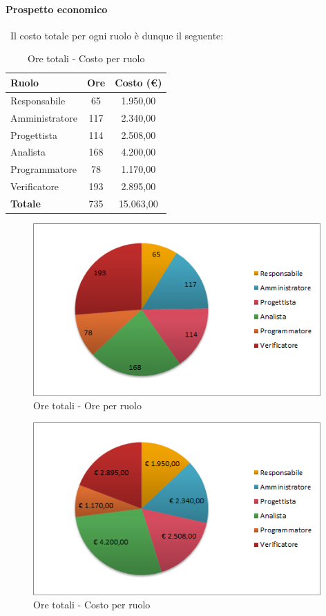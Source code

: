 \documentclass[../PianoDiProgetto.tex]{subfiles}
\begin{document}
\vfill	
	
	\paragraph{Prospetto economico}\
					Il costo totale per ogni ruolo è dunque il seguente:
	\begin{table}[H]
		\centering
		\begin{tabular}{l * {2}{c}}
			\toprule
			\textbf{Ruolo} & \textbf{Ore} & \textbf{Costo (\euro{})} \\
			\midrule
			Responsabile & 65    &  1.950,00 \\
			Amministratore  & 117   &  2.340,00 \\
			Progettista  & 114   &  2.508,00 \\
			Analista & 168   &  4.200,00 \\
			Programmatore  & 78   &  1.170,00 \\
			Verificatore  & 193   &  2.895,00 \\
			\midrule
			\textbf{Totale}  & 735  &  15.063,00 \\
			\bottomrule
			
		\end{tabular}
		\caption{Ore totali - Costo per ruolo}
	\end{table}
\vfill
\newpage	
\vfill
	
	\begin{figure}[H]
		\centering
		\includegraphics[width=11cm, trim=1cm 0cm 1cm 0cm]{grafici/TOT-ruolo}
			\caption{Ore totali - Ore per ruolo}
	\end{figure}	
\vfill
	\begin{figure}[H]
		\centering
		\includegraphics[width=11cm, trim=1cm 0cm 1cm 0cm]{grafici/TOT-costo}
			\caption{Ore totali - Costo per ruolo}
	\end{figure}
\vfill
		
\end{document}
